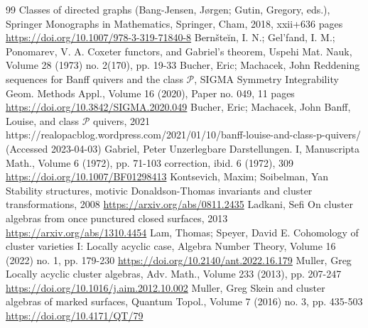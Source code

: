 \begin{thebibliography}{99}
 Classes of directed graphs (Bang-Jensen, Jørgen; Gutin, Gregory, eds.), Springer Monographs in Mathematics, Springer, Cham, 2018, xxii+636 pages \url{https://doi.org/10.1007/978-3-319-71840-8}
 Bernšteĭn, I. N.; Gel’fand, I. M.; Ponomarev, V. A. Coxeter functors, and Gabriel’s theorem, Uspehi Mat. Nauk, Volume 28 (1973) no. 2(170), pp. 19-33
 Bucher, Eric; Machacek, John Reddening sequences for Banff quivers and the class ${\mathcal{P}}$, SIGMA Symmetry Integrability Geom. Methods Appl., Volume 16 (2020), Paper no. 049, 11 pages \url{https://doi.org/10.3842/SIGMA.2020.049}
 Bucher, Eric; Machacek, John Banff, Louise, and class ${\mathcal{P}}$ quivers, 2021 https://realopacblog.wordpress.com/2021/01/10/banff-louise-and-class-p-quivers/ (Accessed 2023-04-03)
 Gabriel, Peter Unzerlegbare Darstellungen. I, Manuscripta Math., Volume 6 (1972), pp. 71-103 correction, ibid. 6 (1972), 309 \url{https://doi.org/10.1007/BF01298413}
 Kontsevich, Maxim; Soibelman, Yan Stability structures, motivic Donaldson-Thomas invariants and cluster transformations, 2008 \url{https://arxiv.org/abs/0811.2435}
 Ladkani, Sefi On cluster algebras from once punctured closed surfaces, 2013 \url{https://arxiv.org/abs/1310.4454}
 Lam, Thomas; Speyer, David E. Cohomology of cluster varieties I: Locally acyclic case, Algebra Number Theory, Volume 16 (2022) no. 1, pp. 179-230 \url{https://doi.org/10.2140/ant.2022.16.179}
 Muller, Greg Locally acyclic cluster algebras, Adv. Math., Volume 233 (2013), pp. 207-247 \url{https://doi.org/10.1016/j.aim.2012.10.002}
 Muller, Greg Skein and cluster algebras of marked surfaces, Quantum Topol., Volume 7 (2016) no. 3, pp. 435-503 \url{https://doi.org/10.4171/QT/79}
\end{thebibliography}
